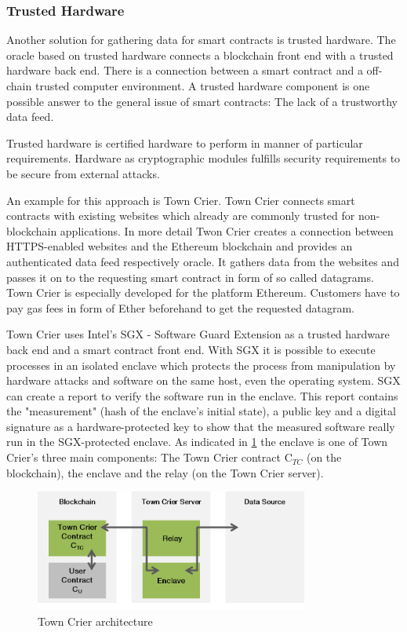 \documentclass[conference]{IEEEtran}
\begin{document}
\subsubsection{Trusted Hardware}
Another solution for gathering data for smart contracts is trusted hardware. The oracle based on trusted hardware connects a blockchain front end with a trusted hardware back end. There is a connection between a smart contract and a off-chain trusted computer environment. A trusted hardware component is one possible answer to the general issue of smart contracts: The lack of a trustworthy data feed. \cite{Zhang2016} \par 
Trusted hardware is certified hardware to perform in manner of particular requirements. Hardware as cryptographic modules fulfills security requirements to be secure from external attacks. \cite{Sion2009} \par 
An example for this approach is Town Crier. Town Crier connects smart contracts with existing websites which already are commonly trusted for non-blockchain applications. In more detail Twon Crier creates a connection between HTTPS-enabled websites and the Ethereum blockchain and provides an authenticated data feed respectively oracle. It gathers data from the websites and passes it on to the requesting smart contract in form of so called datagrams. Town Crier is especially developed for the platform Ethereum. Customers have to pay gas fees in form of Ether beforehand to get the requested datagram. \cite{Zhang2016} \par 
Town Crier uses Intel’s SGX - Software Guard Extension as a trusted hardware back end and a smart contract front end. With SGX it is possible to execute processes in an isolated enclave which protects the process from manipulation by hardware attacks and software on the same host, even the operating system. SGX can create a report to verify the software run in the enclave. This report contains the "measurement" (hash of the enclave's initial state), a public key and a digital signature as a hardware-protected key to show that the measured software really run in the SGX-protected enclave. As indicated in \ref{towncrier} the enclave is one of Town Crier's three main components: The Town Crier contract C$_{TC}$ (on the blockchain), the enclave and the relay (on the Town Crier server). 
\begin{figure}[h]
	\begin{center}
		\includegraphics[width=9cm]{TownCrier.png}
		\caption{Town Crier architecture}
		\label{towncrier}
	\end{center}
\end{figure}
\end{document}
